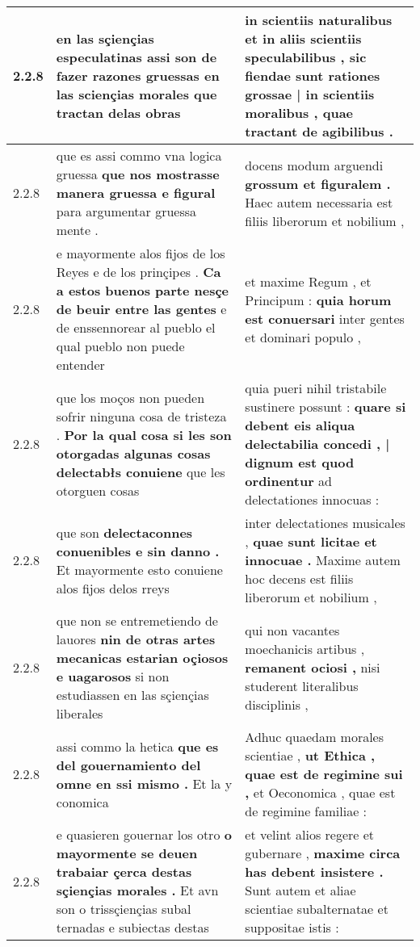 \begin{tabular}{|p{1cm}|p{6.5cm}|p{6.5cm}|}
2.2.8 & en las sçiençias especulatinas \textbf{ assi son de fazer razones gruessas en las sciençias morales } que tractan delas obras & in scientiis naturalibus \textbf{ et in aliis scientiis speculabilibus , sic fiendae sunt rationes grossae | in scientiis moralibus , } quae tractant de agibilibus . \\\hline
2.2.8 & que es assi commo vna logica gruessa \textbf{ que nos mostrasse manera gruessa e figural } para argumentar gruessa mente . & docens modum arguendi \textbf{ grossum et figuralem . } Haec autem necessaria est filiis liberorum et nobilium , \\\hline
2.2.8 & e mayormente alos fijos de los Reyes e de los prinçipes . \textbf{ Ca a estos buenos parte nesçe de beuir entre las gentes } e de enssennorear al pueblo el qual pueblo non puede entender & et maxime Regum , et Principum : \textbf{ quia horum est conuersari } inter gentes et dominari populo , \\\hline
2.2.8 & que los moços non pueden sofrir ninguna cosa de tristeza . \textbf{ Por la qual cosa si les son otorgadas algunas cosas delectabłs conuiene } que les otorguen cosas & quia pueri nihil tristabile sustinere possunt : \textbf{ quare si debent eis aliqua delectabilia concedi , | dignum est quod ordinentur } ad delectationes innocuas : \\\hline
2.2.8 & que son \textbf{ delectaconnes conuenibles e sin danno . } Et mayormente esto conuiene alos fijos delos rreys & inter delectationes musicales , \textbf{ quae sunt licitae et innocuae . } Maxime autem hoc decens est filiis liberorum et nobilium , \\\hline
2.2.8 & que non se entremetiendo de lauores \textbf{ nin de otras artes mecanicas estarian oçiosos e uagarosos } si non estudiassen en las sçiençias liberales & qui non vacantes moechanicis artibus , \textbf{ remanent ociosi , } nisi studerent literalibus disciplinis , \\\hline
2.2.8 & assi commo la hetica \textbf{ que es del gouernamiento del omne en ssi mismo . } Et la y conomica & Adhuc quaedam morales scientiae , \textbf{ ut Ethica , quae est de regimine sui , } et Oeconomica , quae est de regimine familiae : \\\hline
2.2.8 & e quasieren gouernar los otro \textbf{ o mayormente se deuen trabaiar çerca destas sçiençias morales . } Et avn son o trissçiençias subal ternadas e subiectas destas & et velint alios regere et gubernare , \textbf{ maxime circa has debent insistere . } Sunt autem et aliae scientiae subalternatae et suppositae istis : \\\hline

\end{tabular}
